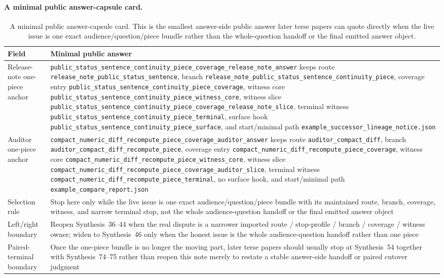 \documentclass[11pt]{article}
\begin{document}
\paragraph{A minimal public answer-capsule card.}
\begin{table}[t]
\centering
\small
\begin{tabularx}{\linewidth}{@{}lX@{}}
\toprule
Field & Minimal public answer \\
\midrule
Release-note one-piece anchor & \nolinkurl{public_status_sentence_continuity_piece_coverage_release_note_answer} keeps route \nolinkurl{release_note_public_status_sentence}, branch \nolinkurl{release_note_public_status_sentence_continuity_piece}, coverage entry \nolinkurl{public_status_sentence_continuity_piece_coverage}, witness core \nolinkurl{public_status_sentence_continuity_piece_witness_core}, witness slice \nolinkurl{public_status_sentence_continuity_piece_coverage_release_note_slice}, terminal witness \nolinkurl{public_status_sentence_continuity_piece_terminal}, surface hook \nolinkurl{public_status_sentence_continuity_piece_surface}, and start/minimal path \nolinkurl{example_successor_lineage_notice.json} \\
Auditor one-piece anchor & \nolinkurl{compact_numeric_diff_recompute_piece_coverage_auditor_answer} keeps route \nolinkurl{auditor_compact_diff}, branch \nolinkurl{auditor_compact_diff_recompute_piece}, coverage entry \nolinkurl{compact_numeric_diff_recompute_piece_coverage}, witness core \nolinkurl{compact_numeric_diff_recompute_piece_witness_core}, witness slice \nolinkurl{compact_numeric_diff_recompute_piece_coverage_auditor_slice}, terminal witness \nolinkurl{compact_numeric_diff_recompute_piece_terminal}, no surface hook, and start/minimal path \nolinkurl{example_compare_report.json} \\
Selection rule & Stop here only while the live issue is one exact audience/question/piece bundle with its maintained route, branch, coverage, witness, and narrow terminal stop, not the whole audience-question handoff or the final emitted answer object \\
Left/right boundary & Reopen Synthesis~36--44 when the real dispute is a narrower imported route / stop-profile / branch / coverage / witness owner; widen to Synthesis~46 only when the honest issue is the whole audience-question handoff rather than one piece \\
Paired-terminal boundary & Once the one-piece bundle is no longer the moving part, later terse papers should usually stop at Synthesis~54 together with Synthesis~74--75 rather than reopen this note merely to restate a stable answer-side handoff or paired cutover judgment \\
\bottomrule
\end{tabularx}
\caption{A minimal public answer-capsule card. This is the smallest answer-side public answer later terse papers can quote directly when the live issue is one exact audience/question/piece bundle rather than the whole-question handoff or the final emitted answer object.}
\label{tab:minimal-public-answer-capsule-card}
\end{table}
\end{document}
